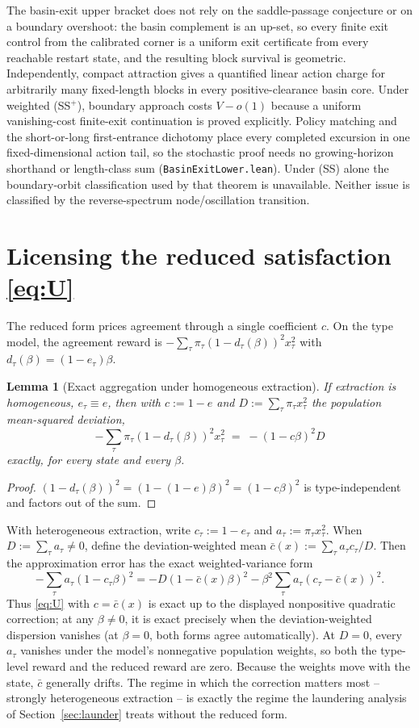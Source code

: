 \documentclass[11pt]{article}
\newtheorem{lemma}[theorem]{Lemma}
\theoremstyle{definition}
\theoremstyle{remark}
\numberwithin{equation}{section}
\begin{document}
The basin-exit upper bracket does not rely on the saddle-passage conjecture or on a boundary overshoot: the basin complement is an up-set, so every finite exit control from the calibrated corner is a uniform exit certificate from every reachable restart state, and the resulting block survival is geometric. Independently, compact attraction gives a quantified linear action charge for arbitrarily many fixed-length blocks in every positive-clearance basin core. Under weighted (SS$^+$), boundary approach costs $V-o(1)$ because a uniform vanishing-cost finite-exit continuation is proved explicitly. Policy matching and the short-or-long first-entrance dichotomy place every completed excursion in one fixed-dimensional action tail, so the stochastic proof needs no growing-horizon shorthand or length-class sum (\texttt{BasinExitLower.lean}). Under (SS) alone the boundary-orbit classification used by that theorem is unavailable. Neither issue is classified by the reverse-spectrum node/oscillation transition.

\appendix
\section[Licensing the reduced satisfaction model]{Licensing the reduced satisfaction \eqref{eq:U}}\label{app:reduced}

The reduced form prices agreement through a single coefficient $c$. On the type model, the agreement reward is $-\sum_\tau \pi_\tau (1-d_\tau(\beta))^2 x_\tau^2$ with $d_\tau(\beta) = (1-e_\tau)\beta$.

\begin{lemma}[Exact aggregation under homogeneous extraction]\label{lem:license}
If extraction is homogeneous, $e_\tau \equiv e$, then with $c := 1-e$ and $D := \sum_\tau \pi_\tau x_\tau^2$ the population mean-squared deviation,
\[
-\sum_\tau \pi_\tau (1-d_\tau(\beta))^2 x_\tau^2 \;=\; -(1-c\beta)^2 D
\]
exactly, for every state and every $\beta$.
\end{lemma}
\begin{proof}
$(1-d_\tau(\beta))^2 = (1-(1-e)\beta)^2 = (1-c\beta)^2$ is type-independent and factors out of the sum.
\end{proof}

With heterogeneous extraction, write $c_\tau := 1-e_\tau$ and $a_\tau:=\pi_\tau x_\tau^2$. When $D:=\sum_\tau a_\tau\ne0$, define the deviation-weighted mean $\bar c(x):=\sum_\tau a_\tau c_\tau/D$. Then the approximation error has the exact weighted-variance form
\[
-\sum_\tau a_\tau(1-c_\tau\beta)^2
=
-D(1-\bar c(x)\beta)^2
-\beta^2\sum_\tau a_\tau(c_\tau-\bar c(x))^2.
\]
Thus \eqref{eq:U} with $c=\bar c(x)$ is exact up to the displayed nonpositive quadratic correction; at any $\beta\ne0$, it is exact precisely when the deviation-weighted dispersion vanishes (at $\beta=0$, both forms agree automatically). At $D=0$, every $a_\tau$ vanishes under the model's nonnegative population weights, so both the type-level reward and the reduced reward are zero. Because the weights move with the state, $\bar c$ generally drifts. The regime in which the correction matters most -- strongly heterogeneous extraction -- is exactly the regime the laundering analysis of Section~\ref{sec:launder} treats without the reduced form.



\end{document}
